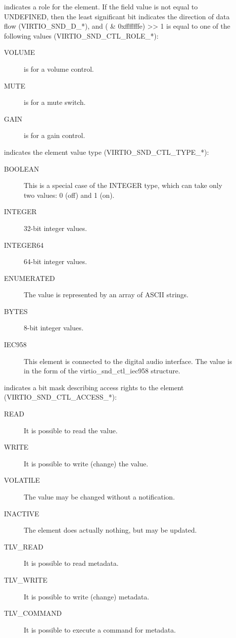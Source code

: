 \begin{description}
\item[] indicates a role for the element. If the field value
is not equal to UNDEFINED, then the least significant bit indicates the direction
of data flow (VIRTIO_SND_D_*), and ( \& 0xfffffffe) >> 1 is equal to
one of the following values (VIRTIO_SND_CTL_ROLE_*):
\begin{description}
\item[VOLUME] is for a volume control.
\item[MUTE] is for a mute switch.
\item[GAIN] is for a gain control.
\end{description}
\item[] indicates the element value type (VIRTIO_SND_CTL_TYPE_*):
\begin{description}
\item[BOOLEAN] This is a special case of the INTEGER type, which can take only
two values: 0 (off) and 1 (on).
\item[INTEGER] 32-bit integer values.
\item[INTEGER64] 64-bit integer values.
\item[ENUMERATED] The value is represented by an array of ASCII strings.
\item[BYTES] 8-bit integer values.
\item[IEC958] This element is connected to the digital audio interface.
The value is in the form of the virtio_snd_ctl_iec958 structure.
\end{description}
\item[] indicates a bit mask describing access rights to the
element (VIRTIO_SND_CTL_ACCESS_*):
\begin{description}
\item[READ] It is possible to read the value.
\item[WRITE] It is possible to write (change) the value.
\item[VOLATILE] The value may be changed without a notification.
\item[INACTIVE] The element does actually nothing, but may be updated.
\item[TLV_READ] It is possible to read metadata.
\item[TLV_WRITE] It is possible to write (change) metadata.
\item[TLV_COMMAND] It is possible to execute a command for metadata.
\end{description}

\end{description}
